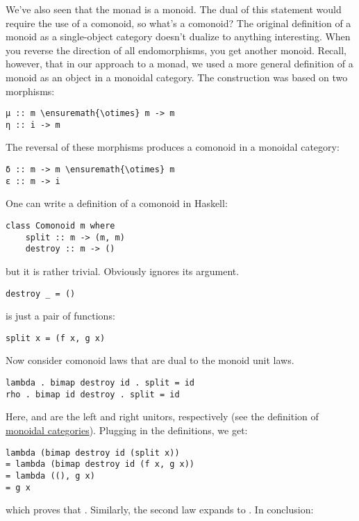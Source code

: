 We've also seen that the monad is a monoid. The dual of this statement
would require the use of a comonoid, so what's a comonoid? The original
definition of a monoid as a single-object category doesn't dualize to
anything interesting. When you reverse the direction of all
endomorphisms, you get another monoid. Recall, however, that in our
approach to a monad, we used a more general definition of a monoid as an
object in a monoidal category. The construction was based on two
morphisms:

\begin{Verbatim}[commandchars=\\\{\}]
μ :: m \ensuremath{\otimes} m -> m
η :: i -> m
\end{Verbatim}
The reversal of these morphisms produces a comonoid in a monoidal
category:

\begin{Verbatim}[commandchars=\\\{\}]
δ :: m -> m \ensuremath{\otimes} m
ε :: m -> i
\end{Verbatim}
One can write a definition of a comonoid in Haskell:

\begin{Verbatim}[commandchars=\\\{\}]
class Comonoid m where
    split :: m -> (m, m)
    destroy :: m -> ()
\end{Verbatim}
but it is rather trivial. Obviously  ignores its
argument.

\begin{Verbatim}[commandchars=\\\{\}]
destroy _ = ()
\end{Verbatim}
 is just a pair of functions:

\begin{Verbatim}[commandchars=\\\{\}]
split x = (f x, g x)
\end{Verbatim}
Now consider comonoid laws that are dual to the monoid unit laws.

\begin{Verbatim}[commandchars=\\\{\}]
lambda . bimap destroy id . split = id
rho . bimap id destroy . split = id
\end{Verbatim}
Here,  and  are the left and right unitors,
respectively (see the definition of
\hyperref[monads-categorically]{monoidal
categories}). Plugging in the definitions, we get:

\begin{Verbatim}[commandchars=\\\{\}]
lambda (bimap destroy id (split x))
= lambda (bimap destroy id (f x, g x))
= lambda ((), g x)
= g x
\end{Verbatim}
which proves that . Similarly, the second law expands
to . In conclusion:

